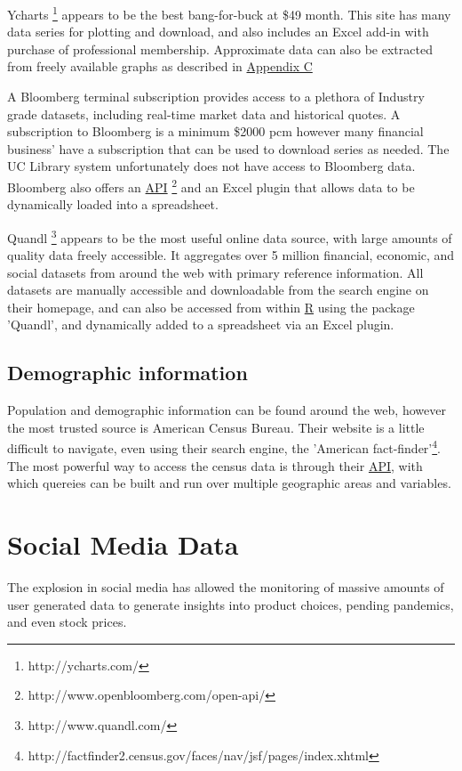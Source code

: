 \documentclass[11pt]{article}
\begin{document}
	Ycharts \footnote{http://ycharts.com/} appears to be the best bang-for-buck at \$49 month. 
	This site has many data series for plotting and download, and also includes an Excel add-in with purchase of professional membership.
	Approximate data can also be extracted from freely available graphs as described in \hyperref[graph]{Appendix C}


	A Bloomberg terminal subscription provides access to a plethora of Industry grade datasets, including real-time market data and historical quotes.
	A subscription to Bloomberg is a minimum \$2000 pcm however many financial business' have a subscription that can be used to download series as needed.
	The UC Library system unfortunately does not have access to Bloomberg data.
	Bloomberg also offers an \hyperref[api]{API} \footnote{http://www.openbloomberg.com/open-api/} and an Excel plugin that allows data to be dynamically loaded into a spreadsheet.

	Quandl \footnote{http://www.quandl.com/} appears to be the most useful online data source, with large amounts of quality data freely accessible.
	It aggregates over 5 million financial, economic, and social datasets from around the web with primary reference information.
	All datasets are manually accessible and downloadable from the search engine on their homepage, and can also be accessed from within \hyperref[R]{R} using the package 'Quandl', and dynamically added to a spreadsheet via an Excel plugin. 

	
	\subsection{Demographic information}

	Population and demographic information can be found around the web, however the most trusted source is American Census Bureau. 
	Their website is a little difficult to navigate, even using their search engine, the 'American fact-finder'\footnote{http://factfinder2.census.gov/faces/nav/jsf/pages/index.xhtml}.
	The most powerful way to access the census data is through their \hyperref[api]{API}, with which quereies can be built and run over multiple geographic areas and variables.


	\section{Social Media Data}
	The explosion in social media has allowed the monitoring of massive amounts of user generated data to generate insights into product choices, pending pandemics, and even stock prices.
\end{document}
